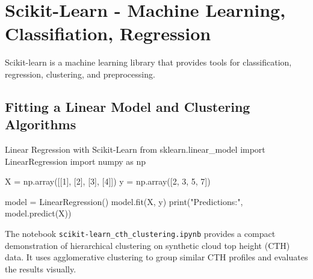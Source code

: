 \section{Scikit-Learn - Machine Learning, Classifiation, Regression}
Scikit-learn is a machine learning library that provides tools for classification, regression, clustering, and preprocessing.

\subsection{Fitting a Linear Model and Clustering Algorithms}

\begin{codeonly}{Linear Regression with Scikit-Learn}
from sklearn.linear_model import LinearRegression
import numpy as np

X = np.array([[1], [2], [3], [4]])
y = np.array([2, 3, 5, 7])

model = LinearRegression()
model.fit(X, y)
print("Predictions:", model.predict(X))
\end{codeonly}

The notebook \texttt{scikit-learn\_cth\_clustering.ipynb} provides a compact demonstration of hierarchical clustering on synthetic cloud top height (CTH) data. It uses agglomerative clustering to group similar CTH profiles and evaluates the results visually.


